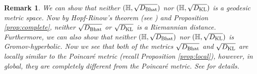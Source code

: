 \documentclass[journal]{IEEEtran}
\newtheorem{remark}[theorem]{Remark}
\begin{document}
\begin{remark}
We can show that neither $(\mathbb H, \sqrt{D_{\textup{Bhat}}})$ nor $(\mathbb H, \sqrt{D_{\textup{KL}}})$ is a geodesic metric space. 
Now by Hopf-Rinow's theorem (see \cite[Theorem 16]{Petersen2006}) and Proposition  \ref{prop:complete}, 
neither $\sqrt{D_{\textup{Bhat}}}$ or $\sqrt{D_{\textup{KL}}}$ is a Riemannian distance. 
Furthermore, we can also show that neither $(\mathbb H, \sqrt{D_{\textup{Bhat}}})$ nor $(\mathbb H, \sqrt{D_{\textup{KL}}})$ is Gromov-hyperbolic. 
Now we see that both of the metrics  $\sqrt{D_{\textup{Bhat}}}$ and $\sqrt{D_{\textup{KL}}}$ are locally similar to the Poincar\'e metric (recall Proposition \ref{prop:local}), however, in global, they are completely different from the Poincar\'e metric.
See \cite{Nielsen2021f} for details. 
\end{remark}






%
%
\end{document}
